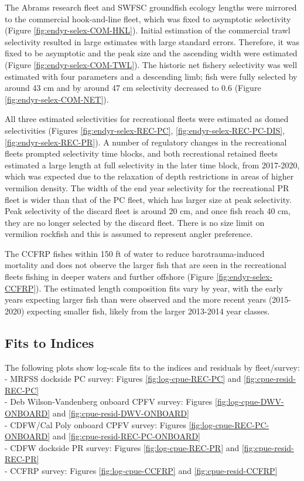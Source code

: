 \documentclass[
  english,
  a4paper,
]{article}
\begin{document}
The Abrams research fleet and SWFSC groundfish ecology lengths were mirrored to the commercial hook-and-line fleet, which was fixed to asymptotic selectivity (Figure \ref{fig:endyr-selex-COM-HKL}). Initial estimation of the commercial trawl selectivity resulted in large estimates with large standard errors. Therefore, it was fixed to be asymptotic and the peak size and the ascending width were estimated (Figure \ref{fig:endyr-selex-COM-TWL}). The historic net fishery selectivity was well estimated with four parameters and a descending limb; fish were fully selected by around 43 cm and by around 47 cm selectivity decreased to 0.6 (Figure \ref{fig:endyr-selex-COM-NET}).

All three estimated selectivities for recreational fleets were estimated as domed selectivities (Figures \ref{fig:endyr-selex-REC-PC}, \ref{fig:endyr-selex-REC-PC-DIS}, \ref{fig:endyr-selex-REC-PR}). A number of regulatory changes in the recreational fleets prompted selectivity time blocks, and both recreational retained fleets estimated a large length at full selectivity in the later time block, from 2017-2020, which was expected due to the relaxation of depth restrictions in areas of higher vermilion density. The width of the end year selectivity for the recreational PR fleet is wider than that of the PC fleet, which has larger size at peak selectivity. Peak selectivity of the discard fleet is around 20 cm, and once fish reach 40 cm, they are no longer selected by the discard fleet. There is no size limit on vermilion rockfish and this is assumed to represent angler preference.

The CCFRP fishes within 150 ft of water to reduce barotrauma-induced mortality and does not observe the larger fish that are seen in the recreational fleets fishing in deeper waters and further offshore (Figure \ref{fig:endyr-selex-CCFRP}). The estimated length composition fits vary by year, with the early years expecting larger fish than were observed and the more recent years (2015-2020) expecting smaller fish, likely from the larger 2013-2014 year classes.

\hypertarget{fits-to-indices}{%
\subsection{Fits to Indices}\label{fits-to-indices}}

The following plots show log-scale fits to the indices and residuals by fleet/survey:
- MRFSS dockside PC survey: Figures \ref{fig:log-cpue-REC-PC} and \ref{fig:cpue-resid-REC-PC}\\
- Deb Wilson-Vandenberg onboard CPFV survey: Figures \ref{fig:log-cpue-DWV-ONBOARD} and \ref{fig:cpue-resid-DWV-ONBOARD}\\
- CDFW/Cal Poly onboard CPFV survey: Figures \ref{fig:log-cpue-REC-PC-ONBOARD} and \ref{fig:cpue-resid-REC-PC-ONBOARD}\\
- CDFW dockside PR survey: Figures \ref{fig:log-cpue-REC-PR} and \ref{fig:cpue-resid-REC-PR}\\
- CCFRP survey: Figures \ref{fig:log-cpue-CCFRP} and \ref{fig:cpue-resid-CCFRP}
\end{document}
